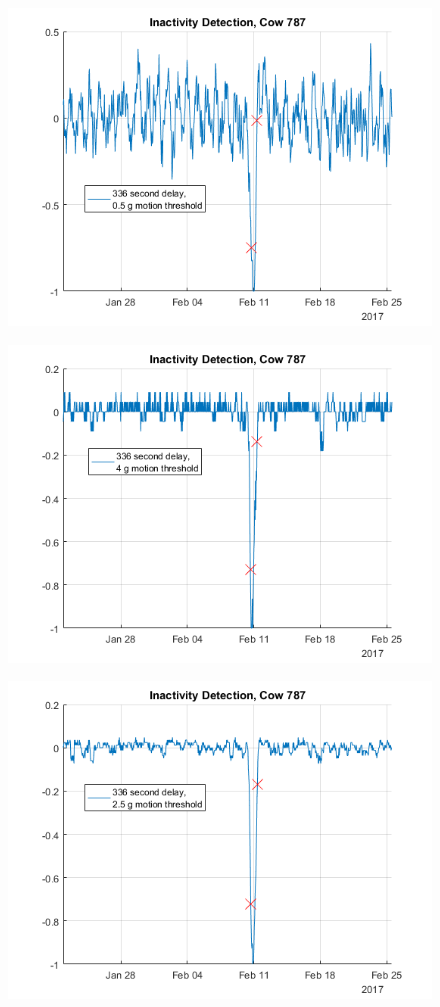 \begin{figure}[htb]
\centering
\includegraphics[width = 0.75 \textwidth]{figures/InactivityDetectionCow787_336period05threshold.png}
\caption{}
\label{InactivityDetectionCow787_336period05threshold}
\end{figure}

\begin{figure}[htb]
\centering
\includegraphics[width = 0.75 \textwidth]{figures/InactivityDetectionCow787_336period4threshold.png}
\caption{}
\label{InactivityDetectionCow787_336period4threshold}
\end{figure}

\begin{figure}[htb]
\centering
\includegraphics[width = 0.75 \textwidth]{figures/InactivityDetectionCow787_336period2_5threshold.png}
\caption{}
\label{InactivityDetectionCow787_336period2_5threshold}
\end{figure}

